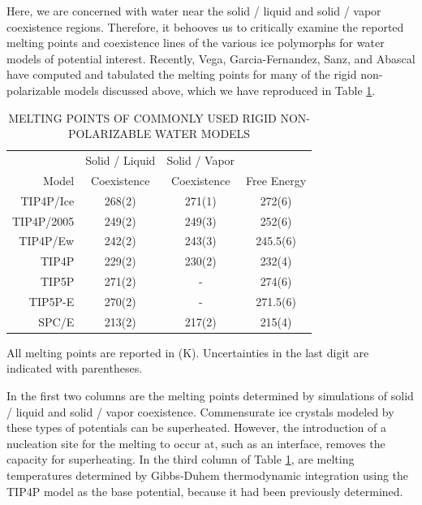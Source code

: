 Here, we are concerned with water near the solid / liquid and solid /
vapor coexistence regions. Therefore, it behooves us to critically
examine the reported melting points and coexistence lines of the
various ice polymorphs for water models of potential
interest. Recently, Vega, Garcia-Fernandez, Sanz, and Abascal have
computed and tabulated the melting points for many of the rigid
non-polarizable models discussed above, which we have reproduced in
Table
\ref{tab:meltingPoints}.\cite{Abascal2005,Abascal2005a,Vega2005,Vega2005a,Fernandez2006,Vega2006a}

\begin{table}[h]
\centering
\caption{MELTING POINTS OF COMMONLY USED RIGID NON-POLARIZABLE
        WATER MODELS \cite{Abascal2005,Abascal2005a,Vega2005,Vega2005a,Fernandez2006,Vega2006a}\label{tab:meltingPoints}} 
\begin{tabular}{rccc}
\hline \hline
& Solid / Liquid & Solid / Vapor & \\
Model & Coexistence & Coexistence & Free Energy \\
\hline
TIP4P/Ice & 268(2) & 271(1) & 272(6) \\
TIP4P/2005 & 249(2) & 249(3) & 252(6) \\
TIP4P/Ew & 242(2) & 243(3) & 245.5(6) \\
TIP4P & 229(2) & 230(2) & 232(4) \\
TIP5P & 271(2) & - & 274(6) \\
TIP5P-E & 270(2) & - & 271.5(6) \\
SPC/E & 213(2) & 217(2) & 215(4) \\
\hline \hline
\end{tabular}
\flushleft
All melting points are reported in (K). 
Uncertainties in the last digit are indicated with parentheses. \\
\end{table}

In the first two columns are the melting points determined by
simulations of solid / liquid and solid / vapor
coexistence. Commensurate ice crystals modeled by these types of
potentials can be superheated.\cite{Vega2006a} However, the
introduction of a nucleation site for the melting to occur at, such as
an interface, removes the capacity for superheating. In the third
column of Table \ref{tab:meltingPoints}, are melting temperatures
determined by Gibbs-Duhem thermodynamic integration\cite{Kofke1993}
using the TIP4P model as the base potential, because it had been
previously determined.\cite{Sanz2004}


